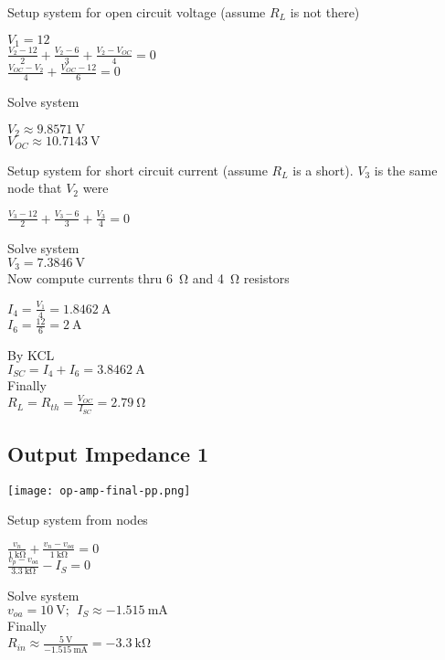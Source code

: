 Setup system for open circuit voltage (assume $R_L$ is not there)\\
\begin{scriptsize}
  $V_{1}=12$\\
  $\frac{V_{2}-12}{2}+\frac{V_{2}-6}{3}+\frac{V_{2}-V_{OC}}{4}=0$\\
  $\frac{V_{OC}-V_{2}}{4}+\frac{V_{OC}-12}{6}=0$\\
\end{scriptsize}
Solve system\\
\begin{scriptsize}
  $V_{2}\approx\qty{9.8571}{\volt}$\\
  $V_{OC}\approx\qty{10.7143}{\volt}$\\
\end{scriptsize}
Setup system for short circuit current (assume $R_L$ is a short). $V_3$
is the same node that $V_2$ were\\
\begin{scriptsize}
  $\frac{V_{3}-12}{2}+\frac{V_{3}-6}{3}+\frac{V_{3}}{4}=0$\\
\end{scriptsize}
Solve system\\
$V_{3}=\qty{7.3846}{\volt}$\\
Now compute currents thru \qty{6}{\ohm} and \qty{4}{\ohm} resistors\\
\begin{scriptsize}
  $I_{4}=\frac{V_{1}}{4}=\qty{1.8462}{\ampere}$\\
  $I_{6}=\frac{12}{6}   =\qty{2}{\ampere}$\\
\end{scriptsize}
By KCL\\
$I_{SC}=I_{4}+I_{6}=\qty{3.8462}{\ampere}$\\
Finally\\
$R_{L}=R_{th}=\frac{V_{OC}}{I_{SC}}=\qty{2.79}{\ohm}$

\subsection*{Output Impedance 1}
\begin{center}
  \texttt{[image: op-amp-final-pp.png]}
\end{center}
Setup system from nodes\\
\begin{scriptsize}
  $\frac{v_n}{\qty{1}{\kilo\ohm}} + \frac{v_n-v_{oa}}{\qty{1}{\kilo\ohm}} = 0$\\
  $\frac{v_p - v_{oa}}{\qty{3.3}{\kilo\ohm}} - I_S = 0$\\
\end{scriptsize}
Solve system\\
$v_{oa} = \qty{10}{\volt};~~I_S\approx\qty{-1.515}{\milli\ampere}$\\
Finally\\
$R_{in} \approx \frac{\qty{5}{\volt}}{\qty{-1.515}{\milli\ampere}} = \qty{-3.3}{\kilo\ohm}$


